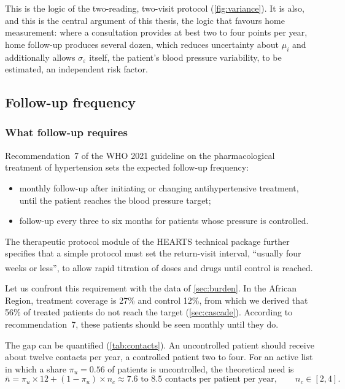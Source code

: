 \documentclass[12pt,a4paper,oneside]{report}
\newcommand{\bq}[1]{``#1''\textsuperscript{\dag}}
\begin{document}
This is the logic of the two-reading, two-visit protocol (\cref{fig:variance}). It is also, and this is the central argument of this thesis, the logic that favours home measurement: where a consultation provides at best two to four points per year, home follow-up produces several dozen, which reduces uncertainty about $\mu_i$ and additionally allows $\sigma_\varepsilon$ itself, the patient's blood pressure variability, to be estimated, an independent risk factor.

\subsection{Follow-up frequency}

\subsubsection{What follow-up requires}\label{sec:followup-requires}

Recommendation~7 of the WHO 2021 guideline on the pharmacological treatment of hypertension \parencite{who2021guideline} sets the expected follow-up frequency:
\begin{itemize}[nosep]
  \item monthly follow-up after initiating or changing antihypertensive treatment, until the patient reaches the blood pressure target;
  \item follow-up every three to six months for patients whose pressure is controlled.
\end{itemize}
The therapeutic protocol module of the HEARTS technical package \parencite{whoHEARTS} further specifies that a simple protocol must set the return-visit interval, \bq{usually four weeks or less}, to allow rapid titration of doses and drugs until control is reached.

Let us confront this requirement with the data of \cref{sec:burden}. In the African Region, treatment coverage is 27\% and control 12\%, from which we derived that 56\% of treated patients do not reach the target (\cref{sec:cascade}). According to recommendation~7, these patients should be seen monthly until they do.

The gap can be quantified (\cref{tab:contacts}). An uncontrolled patient should receive about twelve contacts per year, a controlled patient two to four. For an active list in which a share $\pi_u = 0.56$ of patients is uncontrolled, the theoretical need is
\begin{equation}
  \bar n = \pi_u \times 12 + (1-\pi_u)\times n_c \approx 7.6 \text{ to } 8.5 \text{ contacts per patient per year}, \qquad n_c \in [2,4].
\end{equation}
\end{document}
